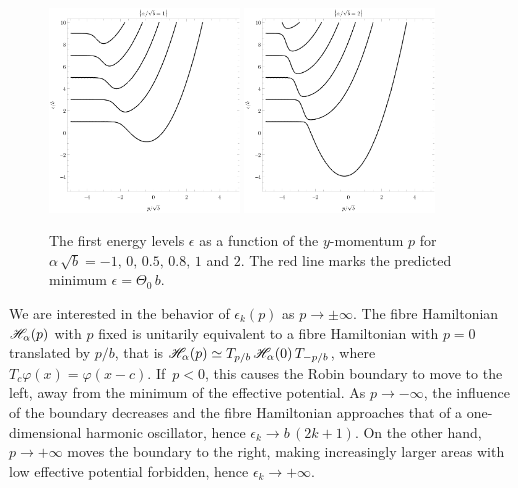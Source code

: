 \begin{figure}[p]
    \\[1em]%
    \includegraphics[width=0.45\textwidth]{grafy/robin1.pdf}%
    \hspace{0.1\textwidth}%
    \includegraphics[width=0.45\textwidth]{grafy/robin2.pdf}\par
    \caption{The first energy levels $\epsilon$ as a function of the $y$-momentum $p$ for $\alpha\,\sqrt{b} = -1, \, 0, \, 0.5, \, 0.8, \, 1$ and $2$. The red line marks the predicted minimum $\epsilon = \Theta_0 \, b$.}
    \label{plots-robin}
\end{figure}

We are interested in the behavior of $\epsilon_k(p)$ as $p \to \pm \infty$. The fibre Hamiltonian $\mathscr{H}_\alpha(p)$ with $p$ fixed is unitarily equivalent to a fibre Hamiltonian with $p=0$ translated by $p/b$, that is $\mathscr{H}_\alpha(p) \simeq T_{p/b} \, \mathscr{H}_\alpha(0) \, T_{-p/b}$, where $T_c \varphi(x) = {\varphi(x - c)}$. If~$p < 0$, this causes the Robin boundary to move to the left, away from the minimum of the effective potential. As $p \to -\infty$, the influence of the boundary decreases and the fibre Hamiltonian approaches that of a one-dimensional harmonic oscillator, hence $\epsilon_k \to b \, (2k+1)$. On the other hand, $p \to +\infty$ moves the boundary to the right, making increasingly larger areas with low effective potential forbidden, hence $\epsilon_k \to +\infty$.

